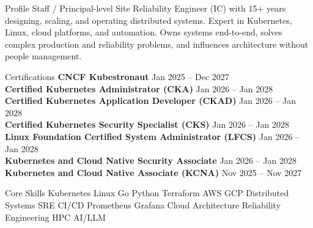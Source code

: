 \documentclass{resume} %
\begin{document}
\begin{rSection}{Profile}
Staff / Principal-level Site Reliability Engineer (IC) with 15+ years designing, scaling, and operating distributed systems.
Expert in Kubernetes, Linux, cloud platforms, and automation. Owns systems end-to-end, solves complex production and reliability problems, and influences architecture without people management.
\end{rSection}

\begin{rSection}{Certifications}
\textbf{CNCF Kubestronaut} \hfill Jan 2025 -- Dec 2027\\
\textbf{Certified Kubernetes Administrator (CKA)} \hfill Jan 2026 -- Jan 2028\\
\textbf{Certified Kubernetes Application Developer (CKAD)} \hfill Jan 2026 -- Jan 2028\\
\textbf{Certified Kubernetes Security Specialist (CKS)} \hfill Jan 2026 -- Jan 2028\\
\textbf{Linux Foundation Certified System Administrator (LFCS)} \hfill Jan 2026 -- Jan 2028\\
\textbf{Kubernetes and Cloud Native Security Associate} \hfill Jan 2026 -- Jan 2028\\
\textbf{Kubernetes and Cloud Native Associate (KCNA)} \hfill Nov 2025 -- Nov 2027\\
\end{rSection}

\begin{rSection}{Core Skills}
Kubernetes \textbullet{} Linux \textbullet{} Go \textbullet{} Python \textbullet{} Terraform \textbullet{} AWS \textbullet{} GCP \textbullet{} Distributed Systems \textbullet{} SRE \textbullet{} CI/CD \textbullet{} Prometheus \textbullet{} Grafana \textbullet{} Cloud Architecture \textbullet{} Reliability Engineering \textbullet{} HPC \textbullet{} AI/LLM
\end{rSection}
\end{document}
